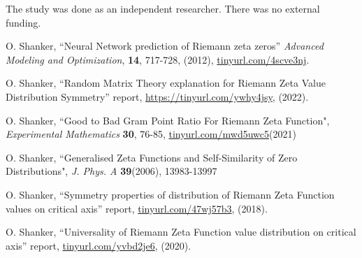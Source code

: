 \documentclass[twoside]{article}
\begin{document}
 The study was done as an independent researcher. There was no
external funding.




\begin{thebibliography}{10}

 O. Shanker, ``Neural Network prediction of Riemann zeta zeros''
{\it Advanced Modeling and Optimization}, {\bf 14}, 717-728, (2012), \url{tinyurl.com/4scve3nj}.


 O. Shanker, 
``Random Matrix Theory explanation for Riemann Zeta Value Distribution Symmetry''
 report,
\url{https://tinyurl.com/ywhy4jsy}, 
(2022). 


 O. Shanker, 
``Good to Bad Gram Point Ratio For Riemann Zeta Function",
{\it Experimental Mathematics} {\bf 30}, 76-85,
\url{tinyurl.com/mwd5uwc5}(2021)

 O. Shanker, 
``Generalised Zeta Functions and Self-Similarity of Zero Distributions",
{\it J.  Phys. A} {\bf39}(2006), 13983-13997

 O. Shanker, 
``Symmetry properties of distribution of Riemann Zeta Function values on critical axis''
 report,
\url{tinyurl.com/47wj57b3}, 
(2018). 

 O. Shanker, 
``Universality of Riemann Zeta Function value distribution on critical axis''
 report,
\url{tinyurl.com/yvbd2je6}, 
(2020). 




\end{thebibliography} 
\end{document}
